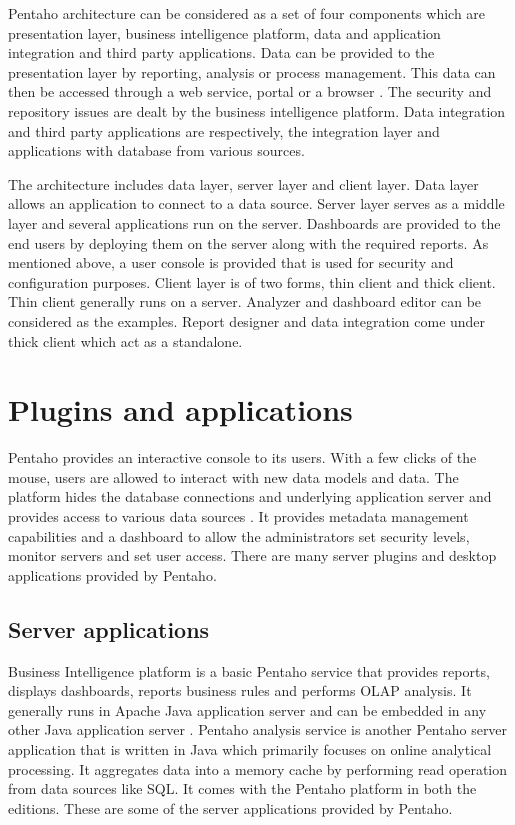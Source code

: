 \documentclass[9pt,twocolumn,twoside]{../../styles/osajnl}
\begin{document}
Pentaho architecture can be considered as a set of four components
which are presentation layer, business intelligence platform, data and
application integration and third party applications. Data can be
provided to the presentation layer by reporting, analysis or process
management. This data can then be accessed through a web service,
portal or a browser \cite{pentaho-architecture}. The security and
repository issues are dealt by the business intelligence
platform. Data integration and third party applications are
respectively, the integration layer and applications with database
from various sources.

The architecture includes data layer, server layer and client
layer. Data layer allows an application to connect to a data
source. Server layer serves as a middle layer and several applications
run on the server. Dashboards are provided to the end users by
deploying them on the server along with the required reports. As
mentioned above, a user console is provided that is used for security
and configuration purposes. Client layer is of two forms, thin client
and thick client. Thin client generally runs on a server. Analyzer and
dashboard editor can be considered as the examples. Report designer
and data integration come under thick client which act as a
standalone.

\section{Plugins and applications}

Pentaho provides an interactive console to its users. With a few
clicks of the mouse, users are allowed to interact with new data
models and data. The platform hides the database connections and
underlying application server and provides access to various data
sources \cite{pentaho-enterprise}. It provides metadata management
capabilities and a dashboard to allow the administrators set security
levels, monitor servers and set user access. There are many server
plugins and desktop applications provided by Pentaho.

\subsection{Server applications}

Business Intelligence platform is a basic Pentaho service that
provides reports, displays dashboards, reports business rules and
performs OLAP analysis. It generally runs in Apache Java application
server and can be embedded in any other Java application server
\cite{pentaho_wikipedia}. Pentaho analysis service is another Pentaho
server application that is written in Java which primarily focuses on
online analytical processing. It aggregates data into a memory cache
by performing read operation from data sources like SQL. It comes with
the Pentaho platform in both the editions. These are some of the
server applications provided by Pentaho.
\end{document}
